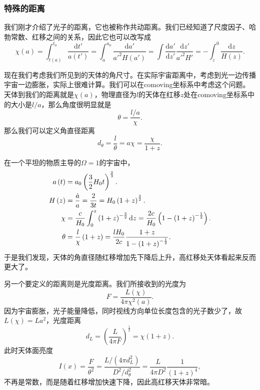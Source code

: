 \documentclass[../天体物理基础.tex]{subfiles}
\begin{document}
\subsubsection{特殊的距离}
我们刚才介绍了光子的距离，它也被称作共动距离。我们已经知道了尺度因子、哈勃常数、红移之间的关系，因此它也可以改写成
\begin{equation}
\chi\left(a\right)=\int_{t\left(a\right)}^{t_0}\frac{\mathrm{d}t'}{a\left(t'\right)}=\int_{a}^{a_{0}}\frac{\mathrm{d}a'}{a'^{2}H\left(a'\right)}=\int\frac{\mathrm{d}a'}{\mathrm{d}z'}\frac{\mathrm{d}z'}{a'^{2}H'}=-\int_{z}^{0}\frac{\mathrm{d}z}{H\left(z\right)}.
\end{equation}

现在我们考虑我们所见到的天体的角尺寸。在实际宇宙距离中，考虑到光一边传播宇宙一边膨胀，实际上很难计算。我们可以在comoving坐标系中考虑这个问题。天体到我们的距离就是$\chi\left(a\right)$，物理直径为$l$的天体在红移$z$处在comoving坐标系中的大小是$l/a$，那么角度很明显就是
\begin{equation}
\theta=\frac{l/a}{\chi}.
\end{equation}
那么我们可以定义角直径距离
\begin{equation}
d_{\theta}=\frac{l}{\theta}=a\chi=\frac{\chi}{1+z}.
\end{equation}

在一个平坦的物质主导的$\Omega=1$的宇宙中，
\begin{align}
a\left(t\right)&=a_{0}\left(\frac32H_{0}t\right)^{\frac23}.\notag\\
H\left(z\right)&=\frac{\dot a}{a}=\frac{2}{3t}=H_{0}\left(1+z\right)^{\frac32}.\notag\\
\chi&=\frac{c}{H_{0}}\int_{0}^{z}\left(1+z\right)^{-\frac32}\mathrm{d}z=\frac{2c}{H_{0}}\left(1-\left(1+z\right)^{-\frac12}\right).\notag\\
\theta&=\frac{l}{\chi}\left(1+z\right)=\frac{lH_{0}}{2c}\frac{1+z}{1-\left(1+z\right)^{-\frac12}}.
\end{align}
于是我们发现，天体的角直径随红移增加先下降后上升，高红移处天体看起来反而更大了。

另一个要定义的距离则是光度距离。我们所接收到的光度为
\begin{equation}
F=\frac{L(\chi)}{4\pi \chi^2(a)}.
\end{equation}
因为宇宙膨胀，光子能量降低，同时视线方向单位长度包含的光子数少了，故$L\left(\chi\right)=La^{2}$，光度距离
\begin{equation}
d_{L}=\left(\frac{L}{4\pi F}\right)^{\frac12}=\chi\left(1+z\right).
\end{equation}
此时天体面亮度
\begin{equation}
I(x)=\frac{F}{\theta^{2}}=\frac{L/(4\pi d_{L}^{2})}{D^{2}/d_{\theta}^{2}}=\frac{L}{4\pi D^{2}}\frac{1}{\left(1+z\right)^{4}},
\end{equation}
不再是常数，而是随着红移增加快速下降，因此高红移天体非常暗。
\end{document}
